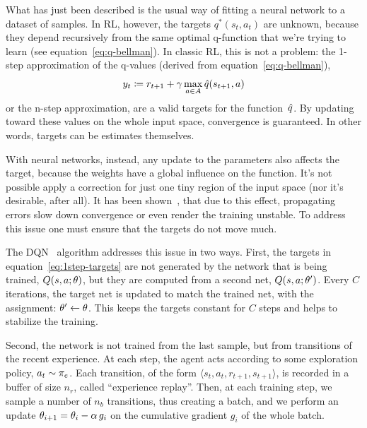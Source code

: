 What has just been described is the usual way of fitting a neural network
to a dataset of samples. In RL, however, the targets $q^*(s_t, a_t)$ are
unknown, because they depend recursively from the same optimal q-function
that we're trying to learn (see equation~\eqref{eq:q-bellman}). In classic RL,
this is not a problem: the 1-step approximation of the q-values (derived from
equation~\eqref{eq:q-bellman}),
\begin{equation}
	y_t \coloneqq r_{t+1} + \gamma \max_{a \in A} \hat{q}(s_{t+1}, a)
	\label{eq:1step-targets}
\end{equation}
or the n-step approximation, are a valid targets for the function~$\hat{q}$.
By updating toward these values on the whole input space, convergence is
guaranteed. In other words, targets can be estimates themselves.

With neural networks, instead, any update to the parameters also affects the
target, because the weights have a global influence on the function. It's not
possible apply a correction for just one tiny region of the input space (nor
it's desirable, after all).  It has been shown~\cite{bib:nfq}, that due to
this effect, propagating errors slow down convergence or even render the
training unstable.  To address this issue one must ensure that the targets do
not move much.

The DQN~\cite{bib:atari-deeprl} algorithm addresses this issue in two ways.
First, the targets in equation~\eqref{eq:1step-targets} are not generated by
the network that is being trained, $Q(s, a; \theta)$, but they are computed
from a second net, $Q(s, a; \theta')$. Every $C$ iterations, the target net
is updated to match the trained net, with the assignment: $\theta' \gets
\theta$. This keeps the targets constant for $C$ steps and helps to stabilize
the training.

Second, the network is not trained from the last sample, but from transitions
of the recent experience. At each step, the agent acts according to some
exploration policy, $a_t \sim \pi_e$. Each transition, of the form
$\langle s_t, a_t, r_{t+1}, s_{t+1} \rangle$, is recorded in a buffer of size
$n_r$, called ``experience replay''. Then, at each training step, we sample a
number of $n_b$ transitions, thus creating a batch, and we perform an update
$\theta_{i+1} = \theta_i - \alpha\, g_i$ on the cumulative gradient $g_i$ of
the whole batch.


